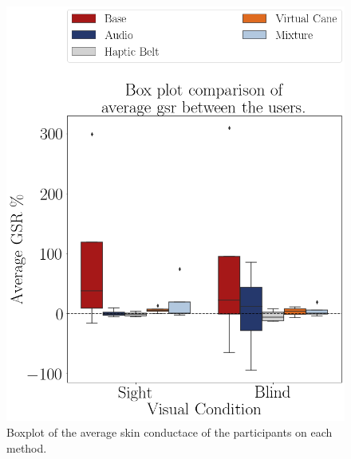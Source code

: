 \begin{figure}[!htb]
    \begin{minipage}{.45\linewidth}
        \centering
        \includegraphics[width = \linewidth]{Resultados/GSR/Figuras/png/boxplot_gsr_avg_scene.png}
        \caption{Boxplot of the average skin conductace of the participants on each method.}
        \label{fig:boxplot_gsr_scene}
    \end{minipage}
    \begin{minipage}{.1\linewidth}
        \hfill
    \end{minipage}
    \begin{minipage}{.45\linewidth}
        \vspace{1.8cm}
        \centering

\end{minipage}
\end{figure}
